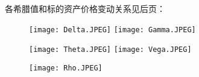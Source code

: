 \documentclass{ctexart}
\begin{document}
    \heiti {}各希腊值和标的资产价格变动关系见后页：
    \newpage
    
    \begin{figure}[ht]

        \centering
        \texttt{[image: Delta.JPEG]}
        \texttt{[image: Gamma.JPEG]}
        
    \end{figure}
    \begin{figure}[ht]

        \centering
        \texttt{[image: Theta.JPEG]}
        \texttt{[image: Vega.JPEG]}
        
    \end{figure}
    \begin{figure}

        \centering
        \texttt{[image: Rho.JPEG]}
        
    \end{figure}
\end{document}
